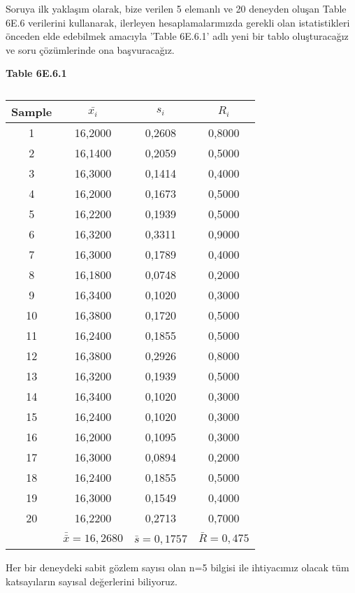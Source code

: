 Soruya ilk yaklaşım olarak, bize verilen 5 elemanlı ve 20 deneyden oluşan Table 6E.6 verilerini kullanarak, ilerleyen hesaplamalarımızda gerekli olan istatistikleri önceden elde edebilmek amacıyla 'Table 6E.6.1' adlı yeni bir tablo oluşturacağız ve soru çözümlerinde ona başvuracağız. 

\renewcommand{\arraystretch}{1.2}

\begin{table}[h!]
	\centering
	\caption*{\bfseries Table 6E.6.1}
	\begin{tabular}{|c|c|c|c|}
		\hline
		\textbf{Sample} & \textbf{$\bar{x_i}$} & \textbf{$s_i$} & \textbf{$R_i$} \\
		\hline
		1 & 16,2000 & 0,2608 & 0,8000 \\
		2 & 16,1400 & 0,2059 & 0,5000 \\
		3 & 16,3000 & 0,1414 & 0,4000 \\
		4 & 16,2000 & 0,1673 & 0,5000 \\
		5 & 16,2200 & 0,1939 & 0,5000 \\
		6 & 16,3200 & 0,3311 & 0,9000 \\
		7 & 16,3000 & 0,1789 & 0,4000 \\
		8 & 16,1800 & 0,0748 & 0,2000 \\
		9 & 16,3400 & 0,1020 & 0,3000 \\
		10 & 16,3800 & 0,1720 & 0,5000 \\
		11 & 16,2400 & 0,1855 & 0,5000 \\
		12 & 16,3800 & 0,2926 & 0,8000 \\
		13 & 16,3200 & 0,1939 & 0,5000 \\
		14 & 16,3400 & 0,1020 & 0,3000 \\
		15 & 16,2400 & 0,1020 & 0,3000 \\
		16 & 16,2000 & 0,1095 & 0,3000 \\
		17 & 16,3000 & 0,0894 & 0,2000 \\
		18 & 16,2400 & 0,1855 & 0,5000 \\
		19 & 16,3000 & 0,1549 & 0,4000 \\
		20 & 16,2200 & 0,2713 & 0,7000 \\
		\cline{2-4}
	&$\bar{\bar{x}}=16,2680$&$\bar{s}=0,175$7&$\bar{R}=0,475$\\
		\hline
	\end{tabular}
	\caption*{}
\end{table}

Her bir deneydeki sabit gözlem sayısı olan n=5 bilgisi ile ihtiyacımız olacak tüm katsayıların sayısal değerlerini biliyoruz.  

